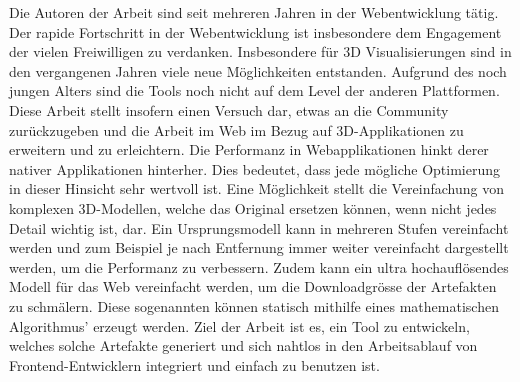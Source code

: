 Die Autoren der Arbeit sind seit mehreren Jahren in der Webentwicklung tätig. Der rapide Fortschritt in der Webentwicklung ist insbesondere dem Engagement der vielen Freiwilligen zu verdanken.
Insbesondere für 3D Visualisierungen sind in den vergangenen Jahren viele neue Möglichkeiten entstanden. Aufgrund des noch jungen Alters sind die Tools noch nicht auf dem Level der anderen Plattformen. Diese Arbeit stellt insofern einen Versuch dar, etwas an die Community zurückzugeben und die Arbeit im Web im Bezug auf 3D-Applikationen zu erweitern und zu erleichtern.
Die Performanz in Webapplikationen hinkt derer nativer Applikationen hinterher. Dies bedeutet, dass jede mögliche Optimierung in dieser Hinsicht sehr wertvoll ist.
Eine Möglichkeit stellt die Vereinfachung von komplexen 3D-Modellen, welche das Original ersetzen können, wenn nicht jedes Detail wichtig ist, dar.
Ein Ursprungsmodell kann in mehreren Stufen vereinfacht werden und zum Beispiel je nach Entfernung immer weiter vereinfacht dargestellt werden, um die Performanz zu verbessern.
Zudem kann ein ultra hochauflösendes Modell für das Web vereinfacht werden, um die Downloadgrösse der Artefakten zu schmälern.
Diese sogenannten  können statisch mithilfe eines mathematischen Algorithmus' erzeugt werden.
Ziel der Arbeit ist es, ein Tool zu entwickeln, welches solche Artefakte generiert und sich nahtlos in den Arbeitsablauf von Frontend-Entwicklern integriert und einfach zu benutzen ist.
